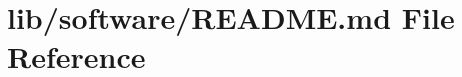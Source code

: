 \hypertarget{lib_2software_2README_8md}{}\section{lib/software/\+R\+E\+A\+D\+ME.md File Reference}
\label{lib_2software_2README_8md}
